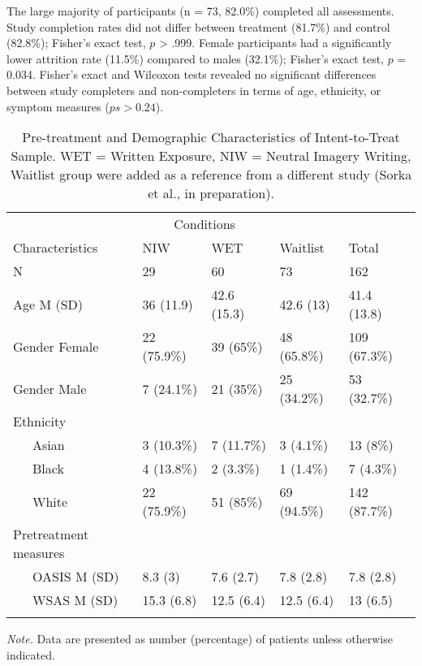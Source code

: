 \documentclass[
  man,floatsintext]{apa7}
\begin{document}
The large majority of participants (n = 73, 82.0\%) completed all assessments.
Study completion rates did not differ between treatment (81.7\%) and control (82.8\%); Fisher's exact test, \(p\) \textgreater{} .999.
Female participants had a significantly lower attrition rate (11.5\%) compared to males (32.1\%); Fisher's exact test, \(p\) = 0.034.
Fisher's exact and Wilcoxon tests revealed no significant differences between study completers and non-completers in terms of age, ethnicity, or symptom measures (\(ps > 0.24\)).



\begin{table}[tbp]

\begin{center}
\begin{threeparttable}

\caption{\label{tab:demographics}Pre-treatment and Demographic Characteristics of Intent-to-Treat Sample. WET = Written Exposure, NIW = Neutral Imagery Writing, Waitlist group were added as a reference from a different study (Sorka et al., in preparation).}

\begin{tabular}{lllll}
\toprule
 & \multicolumn{2}{c}{Conditions}  &\\
\cmidrule(r){2-4}
Characteristics & NIW & WET & Waitlist & Total\\
\midrule
N & 29 & 60 & 73 & 162\\
Age M (SD) & 36 (11.9) & 42.6 (15.3) & 42.6 (13) & 41.4 (13.8)\\
Gender Female & 22 (75.9\%) & 39 (65\%) & 48 (65.8\%) & 109 (67.3\%)\\
Gender Male & 7 (24.1\%) & 21 (35\%) & 25 (34.2\%) & 53 (32.7\%)\\
Ethnicity &  &  &  & \\
\ \ \ Asian & 3 (10.3\%) & 7 (11.7\%) & 3 (4.1\%) & 13 (8\%)\\
\ \ \ Black & 4 (13.8\%) & 2 (3.3\%) & 1 (1.4\%) & 7 (4.3\%)\\
\ \ \ White & 22 (75.9\%) & 51 (85\%) & 69 (94.5\%) & 142 (87.7\%)\\
Pretreatment measures &  &  &  & \\
\ \ \ OASIS M (SD) & 8.3 (3) & 7.6 (2.7) & 7.8 (2.8) & 7.8 (2.8)\\
\ \ \ WSAS M (SD) & 15.3 (6.8) & 12.5 (6.4) & 12.5 (6.4) & 13 (6.5)\\
\bottomrule
\addlinespace
\end{tabular}

\begin{tablenotes}[para]
\normalsize{\textit{Note.} Data are presented as number (percentage) of patients unless otherwise indicated.}
\end{tablenotes}

\end{threeparttable}
\end{center}

\end{table}
\end{document}
